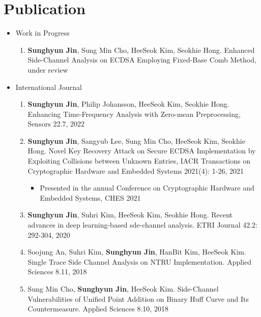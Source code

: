 \documentclass[a4paper,20pt]{article}
\begin{document}
\section{\textbf{Publication}}
\begin{itemize}
    \item {Work in Progress}
        \vspace{-6pt}
        \begin{enumerate}
            \item {\textbf{Sunghyun Jin}, Sung Min Cho, HeeSeok Kim, Seokhie Hong. Enhanced Side-Channel Analysis on ECDSA Employing Fixed-Base Comb Method, under review}
            \vspace{-2pt}
        \end{enumerate}
        
    \item {International Journal}
        \vspace{-6pt}
        \begin{enumerate}
            \item {\textbf{Sunghyun Jin}, Philip Johansson, HeeSeok Kim, Seokhie Hong. Enhancing Time-Frequency Analysis with Zero-mean Preprocessing, Sensors 22.7, 2022}
            \vspace{-2pt}
            \item {\textbf{Sunghyun Jin}, Sangyub Lee, Sung Min Cho, HeeSeok Kim, Seokhie Hong. Novel Key Recovery Attack on Secure ECDSA Implementation by Exploiting Collisions between Unknown Entries, IACR Transactions on Cryptographic Hardware and Embedded Systems 2021(4): 1-26, 2021}
            \vspace{-2pt}
            \begin{itemize}
                \item {Presented in the annual Conference on Cryptographic Hardware and Embedded Systems, CHES 2021}
            \end{itemize}
            \vspace{-2pt}
            \item {\textbf{Sunghyun Jin}, Suhri Kim, HeeSeok Kim, Seokhie Hong. Recent advances in deep learning-based sde-channel analysis. ETRI Journal 42.2: 292-304, 2020}
            \vspace{-2pt}
            \item {Soojung An, Suhri Kim, \textbf{Sunghyun Jin}, HanBit Kim, HeeSeok Kim. Single Trace Side Channel Analysis on NTRU Implementation. Applied Sciences 8.11, 2018}
            \vspace{-2pt}
            \item {Sung Min Cho, \textbf{Sunghyun Jin}, HeeSeok Kim. Side-Channel Vulnerabilities of Unified Point Addition on Binary Huff Curve and Its Countermeasure. Applied Sciences 8.10, 2018}
            \vspace{-2pt}
        \end{enumerate}
        

\end{itemize}
\end{document}
